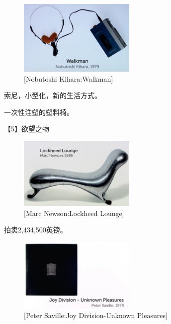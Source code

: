 \documentclass[UTF8]{../RepresentationUniverse}
\begin{document}
\begin{figure}[h]
    \centering
    \includegraphics[width=0.5\textwidth]{./src/figures/Walkman_2023-04-09_20-59-42.png}
    \caption{[Nobutoshi Kihara:Walkman]}
    \label{figure:Walkman}
\end{figure}
索尼，小型化，新的生活方式。

一次性注塑的塑料椅。



【5】欲望之物

\begin{figure}[h]
    \centering
    \includegraphics[width=0.5\textwidth]{./src/figures/Lockheed Lounge_2023-04-09_21-08-42.png}
    \caption{[Marc Newson:Lockheed Lounge]}
    \label{figure:Lockheed Lounge}
\end{figure}
拍卖2,434,500英镑。



\begin{figure}[h]
    \centering
    \includegraphics[width=0.5\textwidth]{./src/figures/Joy Division-Unknown Pleasures_2023-04-09_21-11-12.png}
    \caption{[Peter Saville:Joy Division-Unknown Pleasures]}
    \label{figure:Joy Division-Unknown Pleasures}
\end{figure}
\end{document}
